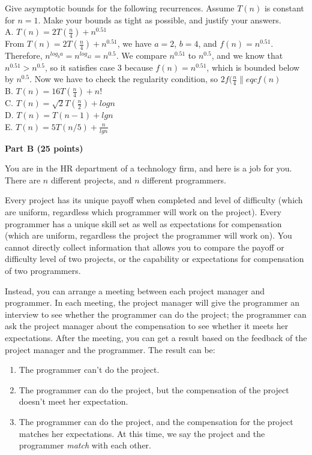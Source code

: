 \documentclass{article}
\begin{document}
\noindent Give asymptotic bounds for the following recurrences. Assume
$T(n)$ is constant for $n = 1$. Make your bounds as tight as possible,
and justify your answers.\\

\noindent A. $T(n) = 2T(\frac{n}{4}) + n^{0.51}$\\
From $T(n) = 2T(\frac{n}{4}) + n^{0.51}$, we have $a=2$, $b=4$, and $f(n)=n^{0.51}$. Therefore, $n^{log_ba} = n^{log_42} = n^{0.5}$. We compare $n^{0.51}$ to $n^{0.5}$, and we know that $n^{0.51} > n^{0.5}$, so it satisfies case 3 because $f(n) = n^{0.51}$, which is bounded below by $n^{0.5}$. Now we have to check the regularity condition, so $2 f(\frac{n}{4} \|eq cf(n)$\\
\noindent B. $T(n) = 16 T(\frac{n}{4}) + n!$\\
\noindent C. $T(n) = \sqrt{2} T(\frac{n}{2}) + logn$\\
\noindent D. $T(n) = T(n-1) + lgn$\\
\noindent E. $T(n) = 5T(n/5) + \frac{n}{lgn}$\\

\begin{center}
{\bf Part B (25 points)}
\end{center}

 You are in the HR department of a
technology firm, and here is a job for you.  There are $n$ different
projects, and $n$ different programmers.

Every project has its unique payoff when completed and level of
difficulty (which are uniform, regardless which programmer will work
on the project).  Every programmer has a unique skill set as well as
expectations for compensation (which are uniform, regardless the
project the programmer will work on). You cannot directly collect
information that allows you to compare the payoff or difficulty level
of two projects, or the capability or expectations for compensation of
two programmers.

Instead, you can arrange a meeting between each project manager and
programmer.  In each meeting, the project manager will give the
programmer an interview to see whether the programmer can do the
project; the programmer can ask the project manager about the
compensation to see whether it meets her expectations.  After the
meeting, you can get a result based on the feedback of the project
manager and the programmer.  The result can be:

\begin{enumerate}
  \item The programmer can't do the project.
  \item The programmer can do the project, but the compensation of the
    project doesn't meet her expectation.
  \item The programmer can do the project, and the compensation for
    the project matches her expectations. At this time, we say the
    project and the programmer \textit{match} with each other.
\end{enumerate}
\end{document}
